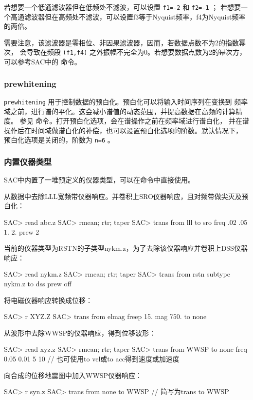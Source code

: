 若想要一个低通滤波器但在低频处不滤波，可以设置 \texttt{f1=-2} 和 \texttt{f2=-1} ；
若想要一个高通滤波器但在高频处不滤波，可以设置f3等于Nyquist频率，f4为Nyquist频率的两倍。

需要注意，该滤波器是零相位、非因果滤波器，因而，若数据点数不为2的指数幂次，
会导致在频段 \texttt{(f1,f4)} 之外振幅不完全为0。若想要数据点数为2的幂次方，
可以参考SAC中的  命令。

\subsubsection{prewhitening}
\texttt{prewhitening} 用于控制数据的预白化。预白化可以将输入时间序列在变换到
频率域之前，进行谱的平化。这会减小谱值的动态范围，并提高数据在高频的计算精度。
参见  命令。打开预白化选项，会在谱操作之前在频率域进行谱白化，
并在谱操作后在时间域做谱白化的补偿，也可以设置预白化选项的阶数。默认情况下，
预白化选项是关闭的，阶数为 \texttt{n=6} 。

\subsubsection{内置仪器类型}
SAC中内置了一堆预定义的仪器类型，可以在命令中直接使用。

从数据中去除LLL宽频带仪器响应。并卷积上SRO仪器响应，且对频带做尖灭及预白化：
\begin{SACCode}
SAC> read abc.z
SAC> rmean; rtr; taper
SAC> trans from lll to sro freq .02 .05 1. 2. prew 2
\end{SACCode}

当前的仪器类型为RSTN的子类型nykm.z，为了去除该仪器响应并卷积上DSS仪器响应：
\begin{SACCode}
SAC> read nykm.z
SAC> rmean; rtr; taper
SAC> trans from rstn subtype nykm.z to dss prew off
\end{SACCode}

将电磁仪器响应转换成位移：
\begin{SACCode}
SAC> r XYZ.Z
SAC> trans from elmag freep 15. mag 750. to none
\end{SACCode}

从波形中去除WWSP的仪器响应，得到位移波形：
\begin{SACCode}
SAC> read xyz.z
SAC> rmean; rtr; taper
SAC> trans from WWSP to none freq 0.05 0.01 5 10
                // 也可使用to vel或to acc得到速度或加速度
\end{SACCode}

向合成的位移地震图中加入WWSP仪器响应：
\begin{SACCode}
SAC> r syn.z
SAC> trans from none to WWSP    // 简写为trans to WWSP
\end{SACCode}

